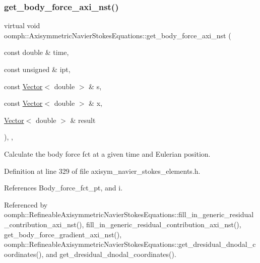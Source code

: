 \mbox{\label{classoomph_1_1AxisymmetricNavierStokesEquations_adf10fc1309b9aeb92dc11be274ae65a2}} 
\subsubsection{\texorpdfstring{get\+\_\+body\+\_\+force\+\_\+axi\+\_\+nst()}{get\_body\_force\_axi\_nst()}}
{\footnotesize\ttfamily virtual void oomph\+::\+Axisymmetric\+Navier\+Stokes\+Equations\+::get\+\_\+body\+\_\+force\+\_\+axi\+\_\+nst (\begin{DoxyParamCaption}\item[{const double \&}]{time,  }\item[{const unsigned \&}]{ipt,  }\item[{const \hyperlink{classoomph_1_1Vector}{Vector}$<$ double $>$ \&}]{s,  }\item[{const \hyperlink{classoomph_1_1Vector}{Vector}$<$ double $>$ \&}]{x,  }\item[{\hyperlink{classoomph_1_1Vector}{Vector}$<$ double $>$ \&}]{result }\end{DoxyParamCaption})\hspace{0.3cm}{\ttfamily [inline]}, {\ttfamily [protected]}, {\ttfamily [virtual]}}



Calculate the body force fct at a given time and Eulerian position. 



Definition at line 329 of file axisym\+\_\+navier\+\_\+stokes\+\_\+elements.\+h.



References Body\+\_\+force\+\_\+fct\+\_\+pt, and i.



Referenced by oomph\+::\+Refineable\+Axisymmetric\+Navier\+Stokes\+Equations\+::fill\+\_\+in\+\_\+generic\+\_\+residual\+\_\+contribution\+\_\+axi\+\_\+nst(), fill\+\_\+in\+\_\+generic\+\_\+residual\+\_\+contribution\+\_\+axi\+\_\+nst(), get\+\_\+body\+\_\+force\+\_\+gradient\+\_\+axi\+\_\+nst(), oomph\+::\+Refineable\+Axisymmetric\+Navier\+Stokes\+Equations\+::get\+\_\+dresidual\+\_\+dnodal\+\_\+coordinates(), and get\+\_\+dresidual\+\_\+dnodal\+\_\+coordinates().

